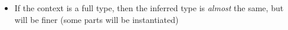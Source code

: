 \documentclass{article}
\begin{document}
\begin{itemize}
	\item If the context is a full type, then the inferred type is \emph{almost} the same, but will be finer (some parts will be instantiated)
\end{itemize}

\end{document}
